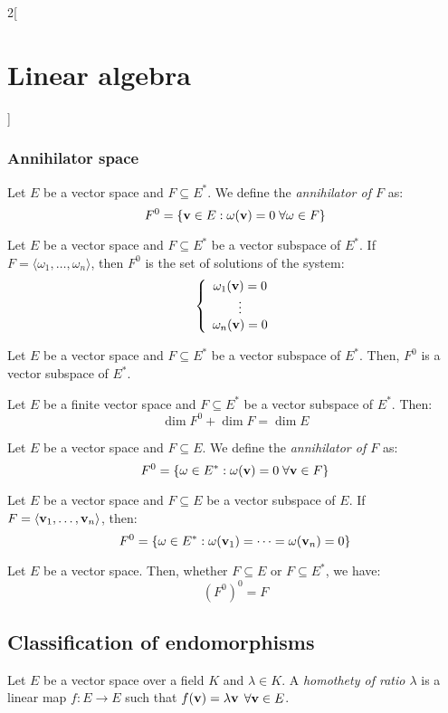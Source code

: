 \documentclass[../../../main.tex]{subfiles}
\begin{document}
\begin{multicols}{2}[\section{Linear algebra}]
\subsubsection*{Annihilator space}
\begin{definition}
    Let $E$ be a vector space and $F\subseteq E^*$. We define the \textit{annihilator of $F$} as: 
    $$F^0=\{\vb{v}\in E:\omega(\vb{v})=0\;\forall\omega\in F\}$$
\end{definition}
\begin{lemma}
    Let $E$ be a vector space and $F\subseteq E^*$ be a vector subspace of $E^*$. If $F=\langle\omega_1,\ldots,\omega_n\rangle$, then $F^0$ is the set of solutions of the system:
    $$\left\{
    \begin{array}{c}
        \omega_1(\vb{v})=0\\
        \vdots\\
        \omega_n(\vb{v})=0
    \end{array}
    \right.$$
\end{lemma}
\begin{lemma}
    Let $E$ be a vector space and $F\subseteq E^*$ be a vector subspace of $E^*$. Then, $F^0$ is a vector subspace of $E^*$.
\end{lemma}
\begin{theorem}
    Let $E$ be a finite vector space and $F\subseteq E^*$ be a vector subspace of $E^*$. Then: $$\dim F^0+\dim F=\dim E$$
\end{theorem}
\begin{definition}
    Let $E$ be a vector space and $F\subseteq E$. We define the \textit{annihilator of $F$} as: 
    $$F^0=\{\omega\in E^*:\omega(\vb{v})=0\;\forall\vb{v}\in F\}$$
\end{definition}
\begin{lemma}
    Let $E$ be a vector space and $F\subseteq E$  be a vector subspace of $E$. If $F=\langle\vb{v}_1,\ldots,\vb{v}_n\rangle$, then: $$F^0=\{\omega\in E^*:\omega(\vb{v}_1)=\cdots=\omega(\vb{v}_n)=0\}$$
\end{lemma}
\begin{prop}
    Let $E$ be a vector space. Then, whether $F\subseteq E$ or $F\subseteq E^*$, we have: $${(F^0)}^0=F$$
\end{prop}
\subsection{Classification of endomorphisms}
\begin{definition}
    Let $E$ be a vector space over a field $K$ and $\lambda\in K$. A \textit{homothety of ratio $\lambda$} is a linear map $f:E\rightarrow E$ such that $f(\vb{v})=\lambda\vb{v}$ $\forall\vb{v}\in E$.
\end{definition}

\end{multicols}
\end{document}

